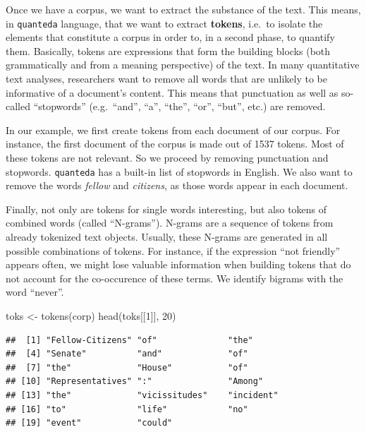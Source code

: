 \documentclass[
  12pt,
]{style/krantz}
\newenvironment{Shaded}{\begin{snugshade}}{\end{snugshade}}
\newcommand{\DecValTok}[1]{\textcolor[rgb]{0.00,0.00,0.81}{#1}}
\newcommand{\FunctionTok}[1]{\textcolor[rgb]{0.00,0.00,0.00}{#1}}
\newcommand{\NormalTok}[1]{#1}
\newcommand{\OtherTok}[1]{\textcolor[rgb]{0.56,0.35,0.01}{#1}}
\begin{document}
Once we have a corpus, we want to extract the substance of the text. This means, in \texttt{quanteda} language, that we want to extract \textbf{tokens}, i.e.~to isolate the elements that constitute a corpus in order to, in a second phase, to quantify them. Basically, tokens are expressions that form the building blocks (both grammatically and from a meaning perspective) of the text. In many quantitative text analyses, researchers want to remove all words that are unlikely to be informative of a document's content. This means that punctuation as well as so-called ``stopwords'' (e.g.~``and'', ``a'', ``the'', ``or'', ``but'', etc.) are removed.

In our example, we first create tokens from each document of our corpus. For instance, the first document of the corpus is made out of 1537 tokens. Most of these tokens are not relevant. So we proceed by removing punctuation and stopwords. \texttt{quanteda} has a built-in list of stopwords in English. We also want to remove the words \emph{fellow} and \emph{citizens}, as those words appear in each document.

Finally, not only are tokens for single words interesting, but also tokens of combined words (called ``N-grams''). N-grams are a sequence of tokens from already tokenized text objects. Usually, these N-grams are generated in all possible combinations of tokens. For instance, if the expression ``not friendly'' appears often, we might lose valuable information when building tokens that do not account for the co-occurence of these terms. We identify bigrams with the word ``never''.

\begin{Shaded}
\begin{Highlighting}[]
\NormalTok{toks }\OtherTok{\textless{}{-}} \FunctionTok{tokens}\NormalTok{(corp)}
\FunctionTok{head}\NormalTok{(toks[[}\DecValTok{1}\NormalTok{]], }\DecValTok{20}\NormalTok{)}
\end{Highlighting}
\end{Shaded}

\begin{verbatim}
##  [1] "Fellow-Citizens" "of"              "the"            
##  [4] "Senate"          "and"             "of"             
##  [7] "the"             "House"           "of"             
## [10] "Representatives" ":"               "Among"          
## [13] "the"             "vicissitudes"    "incident"       
## [16] "to"              "life"            "no"             
## [19] "event"           "could"
\end{verbatim}
\end{document}
